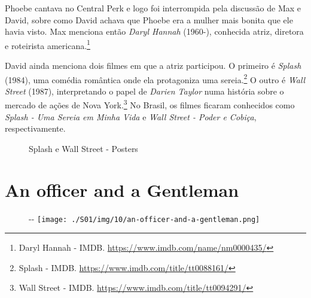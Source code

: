 Phoebe cantava no Central Perk e logo foi interrompida pela discussão de
Max e David, sobre como David achava que Phoebe era a mulher mais bonita
que ele havia visto. Max menciona então \emph{Daryl Hannah} (1960-),
conhecida atriz, diretora e roteirista americana.\footnote{\sloppy Daryl Hannah - IMDB. \url{https://www.imdb.com/name/nm0000435/}}

David ainda menciona dois filmes em que a atriz participou. O primeiro é
\emph{Splash} (1984), uma comédia romântica onde ela protagoniza uma
sereia.\footnote{\sloppy Splash - IMDB. \url{https://www.imdb.com/title/tt0088161/}}
O outro é \emph{Wall Street} (1987), interpretando o papel de
\emph{Darien Taylor} numa história sobre o mercado de ações de Nova
York.\footnote{\sloppy Wall Street - IMDB. \url{https://www.imdb.com/title/tt0094291/}}
No Brasil, os filmes ficaram conhecidos como \emph{Splash - Uma Sereia
em Minha Vida} e \emph{Wall Street - Poder e Cobiça}, respectivamente.

\begin{figure}
  \centering
    \caption{Splash e Wall Street - Posters\label{fig:splash-e-wall-street-posters}}
\end{figure}

\hypertarget{an-officer-and-a-gentleman}{%
\section{An officer and a Gentleman}\label{an-officer-and-a-gentleman}}

\begin{figure}[!ht]
  \begin{adjustwidth}{-\oddsidemargin-1in}{-\rightmargin}
    \centering
    \texttt{[image: ./S01/img/10/an-officer-and-a-gentleman.png]}
  \end{adjustwidth}
\end{figure}

